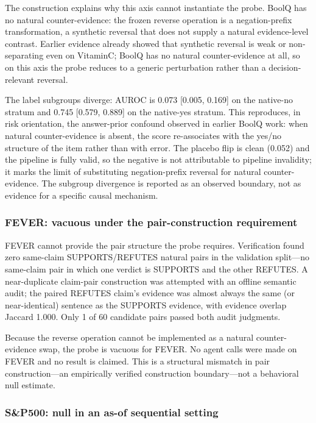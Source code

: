 \documentclass[11pt]{article}
\begin{document}
The construction explains why this axis cannot instantiate the probe. BoolQ has no natural counter-evidence: the frozen reverse operation is a negation-prefix transformation, a synthetic reversal that does not supply a natural evidence-level contrast. Earlier evidence already showed that synthetic reversal is weak or non-separating even on VitaminC; BoolQ has no natural counter-evidence at all, so on this axis the probe reduces to a generic perturbation rather than a decision-relevant reversal.

The label subgroups diverge: AUROC is 0.073 [0.005, 0.169] on the native-no stratum and 0.745 [0.579, 0.889] on the native-yes stratum. This reproduces, in risk orientation, the answer-prior confound observed in earlier BoolQ work: when natural counter-evidence is absent, the score re-associates with the yes/no structure of the item rather than with error. The placebo flip is clean (0.052) and the pipeline is fully valid, so the negative is not attributable to pipeline invalidity; it marks the limit of substituting negation-prefix reversal for natural counter-evidence. The subgroup divergence is reported as an observed boundary, not as evidence for a specific causal mechanism.

\subsubsection{FEVER: vacuous under the pair-construction requirement}

FEVER cannot provide the pair structure the probe requires. Verification found zero same-claim SUPPORTS/REFUTES natural pairs in the validation split---no same-claim pair in which one verdict is SUPPORTS and the other REFUTES. A near-duplicate claim-pair construction was attempted with an offline semantic audit; the paired REFUTES claim's evidence was almost always the same (or near-identical) sentence as the SUPPORTS evidence, with evidence overlap Jaccard 1.000. Only 1 of 60 candidate pairs passed both audit judgments.

Because the reverse operation cannot be implemented as a natural counter-evidence swap, the probe is vacuous for FEVER. No agent calls were made on FEVER and no result is claimed. This is a structural mismatch in pair construction---an empirically verified construction boundary---not a behavioral null estimate.

\subsubsection{S\&P500: null in an as-of sequential setting}
\end{document}
